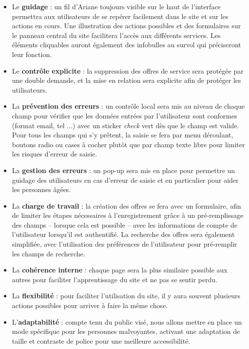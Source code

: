 \documentclass[a4paper,11pt]{article}
\begin{document}
\begin{itemize}
  \item Le \textbf{guidage} : un fil d’Ariane toujours visible sur le haut de l’interface permettra aux utilisateurs de
  se repérer facilement dans le site et sur les actions en cours. Une illustration des actions
  possibles et des formulaires sur le panneau central du site facilitera l’accès aux différents
  services. Les éléments cliquables auront également des infobulles au survol qui préciseront leur fonction.
  \item Le \textbf{contrôle explicite} : la suppression des offres de service sera protégée par une double
  demande, et la mise en relation sera explicite afin de protéger les utilisateurs.
  \item La \textbf{prévention des erreurs} : un contrôle local sera mis au niveau de chaque champ pour vérifier que
  les données entrées par l'utilisateur sont conformes (format email, tel ...) avec un sticker \textit{check} vert
  dès que le champ est valide. Pour tous les champs qui s'y prêtent, la saisie se fera par menu déroulant, boutons radio ou cases à cocher plutôt que par champ texte libre pour limiter les risques d'erreur de saisie.
  \item La \textbf{gestion des erreurs} : un pop-up sera mis en place pour permettre un guidage des
  utilisateurs en cas d’erreur de saisie et en particulier pour aider les personnes âgées.
  \item La \textbf{charge de travail} : la création des offres se fera avec un formulaire, afin de limiter les étapes
  nécessaires à l’enregistrement grâce à un pré-remplissage des champs -- lorsque cela est possible --
  avec les informations de compte de l’utilisateur lorsqu’il est authentifié. La recherche des
  offres sera également simplifiée, avec l’utilisation des préférences de l’utilisateur pour
  pré-remplir les champs de recherche.
  \item La \textbf{cohérence interne} : chaque page sera la plus similaire possible aux autres pour faciliter
  l'apprentissage du site et ne pas se sentir perdu.
  \item La \textbf{flexibilité} : pour faciliter l'utilisation du site, il y aura souvent plusieurs actions possibles
  pour arriver à faire la même chose.
  \item L'\textbf{adaptabilité} : compte tenu du public visé, nous allons mettre en place un mode spécifique
  pour les personnes malvoyantes, activant une adaptation de taille et contraste de police pour
  une meilleure accessibilité.
\end{itemize}
\end{document}
